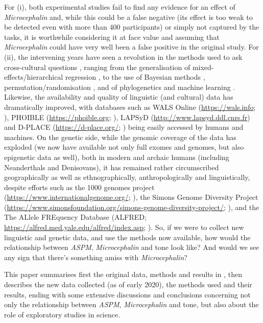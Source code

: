 \documentclass[twoside,onecolumn]{article}
\begin{document}
For (i), both experimental studies \citep{wong_plosone_2012,wong_sciadv_2020} fail to find any evidence for an effect of \textit{Microcephalin} and, while this could be a false negative (its effect is too weak to be detected even with more than 400 participants) or simply not captured by the tasks, it is worthwhile considering it at face value and assuming that \textit{Microcephalin} could have very well been a false positive in the original \citet{dediu_ladd_2007} study.
For (ii), the intervening years have seen a revolution in the methods used to ask cross-cultural questions \citep{ladd_correlational_2015}, ranging from the generalisation of mixed-effects/hierarchical regression \citep{jaeger_mixed_2011,gelman_data_2006}, to the use of Bayesian methods \citep{blasi_human_2019,mcelreath_statistical_2020}, permutation/randomisation \citep{janssen_randomization_2006}, and of phylogenetics \citep{bouckaert_mapping_2012} and machine learning \citep{her_statistical_2020}.
Likewise, the availability and quality of linguistic (and cultural) data has dramatically improved, with databases such as WALS Online (\url{https://wals.info}; \citealp{dryer_wals_2013}), PHOIBLE (\url{https://phoible.org}; \citealp{moran_phoible_2014}), LAPSyD (\url{http://www.lapsyd.ddl.cnrs.fr}) and D-PLACE (\url{https://d-place.org/}; \citealp{kirby_dplace_2016}) being easily accessed by humans and machines.
On the genetic side, while the genomic coverage of the data has exploded (we now have available not only full exomes and genomes, but also epigenetic data as well), both in modern and archaic humans (including Neanderthals and Denisovans), it has remained rather circumscribed geographically as well as ethnographically, anthropologically and linguistically, despite efforts such as the 1000 genomes project (\url{https://www.internationalgenome.org/}; \citealp{the_1000_genomes_2015}), the Simons Genome Diversity Project (\url{https://www.simonsfoundation.org/simons-genome-diversity-project/}; \citealp{mallick_simons_2016}), and the The ALlele FREquency Database (ALFRED; \url{https://alfred.med.yale.edu/alfred/index.asp}; \citealp{rajeevan_alfred_2003}).
So, if we were to collect new linguistic and genetic data, and use the methods now available, how would the relationship between \textit{ASPM}, \textit{Microcephalin} and tone look like?
And would we see any sign that there's something amiss with \textit{Microcephalin}?

This paper summarises first the original data, methods and results in \citet{dediu_ladd_2007}, then describes the new data collected (as of early 2020), the methods used and their results, ending with some extensive discussions and conclusions concerning not only the relationship between \textit{ASPM}, \textit{Microcephalin} and tone, but also about the role of exploratory studies in science.
\end{document}
